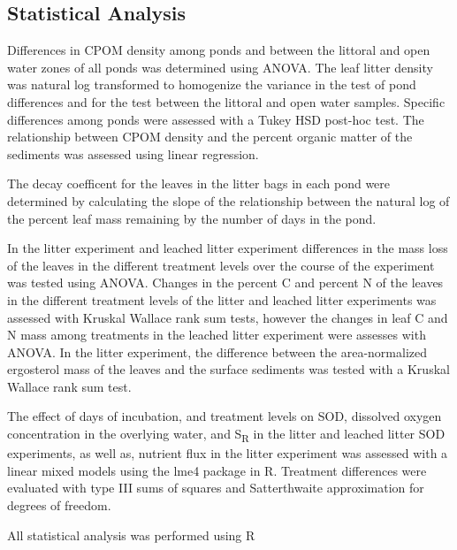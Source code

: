 \subsection{Statistical Analysis}

Differences in CPOM density among ponds and between the littoral and open water zones of all ponds was determined using ANOVA. The leaf litter density was natural log transformed to homogenize the variance in the test of pond differences and for the test between the littoral and open water samples. Specific differences among ponds were assessed with a Tukey HSD post-hoc test. The relationship between CPOM density and the percent organic matter of the sediments was assessed using linear regression.

The decay coefficent for the leaves in the litter bags in each pond were determined by calculating the slope of the relationship between the natural log of the percent leaf mass remaining by the number of days in the pond.

In the litter experiment and leached litter experiment differences in the mass loss of the leaves in the different treatment levels over the course of the experiment was tested using ANOVA. Changes in the percent C and percent N of the leaves in the different treatment levels of the litter and leached litter experiments was assessed with Kruskal Wallace rank sum tests, however the changes in leaf C and N mass among treatments in the leached litter experiment were assesses with ANOVA. In the litter experiment, the difference between the area-normalized ergosterol mass of the leaves and the surface sediments was tested with a Kruskal Wallace rank sum test.

The effect of days of incubation, and treatment levels on SOD, dissolved oxygen concentration in the overlying water,  and S\textsubscript{R} in the litter and leached litter SOD experiments, as well as, nutrient flux in the litter experiment was assessed with a linear mixed models using the lme4 package \cite{lme4} in R. Treatment differences were evaluated with type III sums of squares and Satterthwaite approximation for degrees of freedom.

All statistical analysis was performed using R \cite{R}

